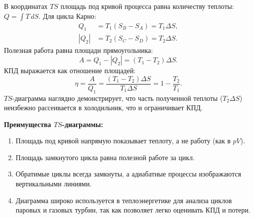 \begin{theorem}
В координатах $TS$ площадь под кривой процесса равна количеству теплоты: $Q = \int T \, dS$.
Для цикла Карно:
\begin{align}
    Q_1 &= T_1 (S_B - S_A) = T_1 \Delta S, \\
    |Q_2| &= T_2 (S_C - S_D) = T_2 \Delta S.
\end{align}
Полезная работа равна площади прямоугольника:
\begin{equation}
    A = Q_1 - |Q_2| = (T_1 - T_2) \Delta S.
\end{equation}
КПД выражается как отношение площадей:
\begin{equation}
    \eta = \frac{A}{Q_1} = \frac{(T_1 - T_2) \Delta S}{T_1 \Delta S} = 1 - \frac{T_2}{T_1}.
\end{equation}
$TS$-диаграмма наглядно демонстрирует, что часть полученной теплоты ($T_2 \Delta S$) неизбежно рассеивается в холодильник, что и ограничивает КПД.
\end{theorem}

\begin{remark}
\textbf{Преимущества $TS$-диаграммы:}
\begin{enumerate}
    \item Площадь под кривой напрямую показывает теплоту, а не работу (как в $pV$).
    \item Площадь замкнутого цикла равна полезной работе за цикл.
    \item Обратимые циклы всегда замкнуты, а адиабатные процессы изображаются вертикальными линиями.
    \item Диаграмма широко используется в теплоэнергетике для анализа циклов паровых и газовых турбин, так как позволяет легко оценивать КПД и потери.
\end{enumerate}
\end{remark}

